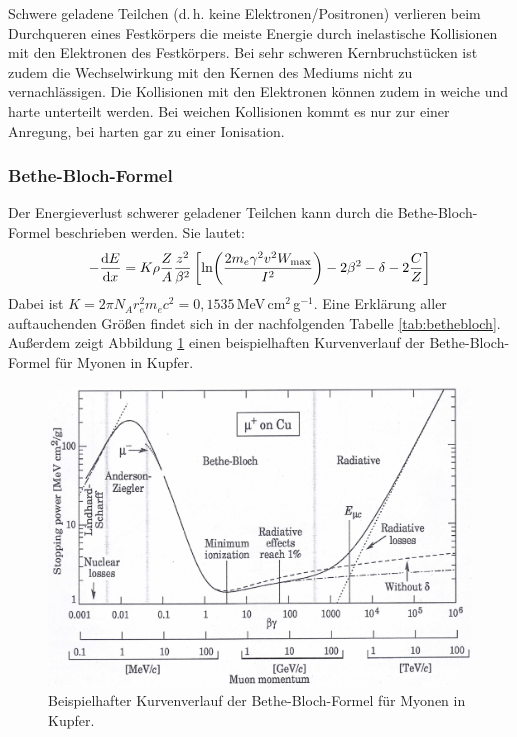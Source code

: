 Schwere geladene Teilchen (d.\,h. keine Elektronen/Positronen) verlieren beim Durchqueren eines Festkörpers die meiste Energie durch inelastische Kollisionen mit den Elektronen des Festkörpers. Bei sehr schweren Kernbruchstücken ist zudem die Wechselwirkung mit den Kernen des Mediums nicht zu vernachlässigen. Die Kollisionen mit den Elektronen können zudem in weiche und harte unterteilt werden. Bei weichen Kollisionen kommt es nur zur einer Anregung, bei harten gar zu einer Ionisation. 

\subsubsection{Bethe-Bloch-Formel}

Der Energieverlust schwerer geladener Teilchen kann durch die Bethe-Bloch-Formel beschrieben werden. Sie lautet:
\begin{align}
	\label{eq:bethebloch}
	-\derivative{E}{x}=K\rho \frac{Z}{A}\frac{z^2}{\beta^2}\left[ \ln(\frac{2m_e\gamma^2v^2W_\text{max}}{I^2})-2\beta^2-\delta -2\frac{C}{Z}\right] 
\end{align}
Dabei ist $K=2\pi N_A r_e^2m_ec^2=0,1535\,$MeV\,cm$^2$\,g$^{-1}$. Eine Erklärung aller auftauchenden Größen findet sich in der nachfolgenden Tabelle \ref{tab:bethebloch}. Außerdem zeigt Abbildung \ref{bethebloch} einen beispielhaften Kurvenverlauf der Bethe-Bloch-Formel für Myonen in Kupfer.

\begin{figure}[h]
	\centering
	\includegraphics[width=\textwidth]{img/BetheBloch}
	\caption{Beispielhafter Kurvenverlauf der Bethe-Bloch-Formel für Myonen in Kupfer. \cite{bethebloch}}
	\label{bethebloch}
\end{figure}

